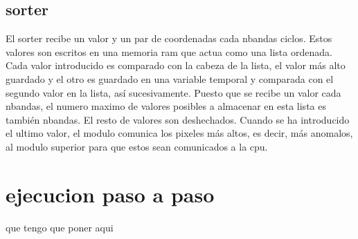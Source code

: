 \subsection{sorter}
 El sorter recibe un valor y un par de coordenadas cada nbandas ciclos. Estos valores son escritos en una memoria ram que actua como una lista ordenada. Cada valor introducido es comparado con la cabeza de la lista, el valor más alto guardado y el otro es guardado en una variable temporal y comparada con el segundo valor en la lista, así sucesivamente. Puesto que se recibe un valor cada nbandas, el numero maximo de valores posibles a almacenar en esta lista es también nbandas. El resto de valores son deshechados. Cuando se ha introducido el ultimo valor, el modulo comunica los pixeles más altos, es decir, más anomalos, al modulo superior para que estos sean comunicados a la cpu.
\section{ejecucion paso a paso}
que tengo que poner aqui

